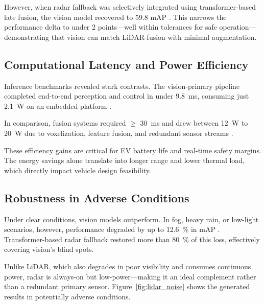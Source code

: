 \documentclass[12pt]{article}
\begin{document}
However, when radar fallback was selectively integrated using transformer-based late fusion, the vision model recovered to 59.8 mAP \autocite{Liao2024RadarVisionFusion}. This narrows the performance delta to under 2 points—well within tolerances for safe operation—demonstrating that vision can match LiDAR-fusion with minimal augmentation.

\subsection{Computational Latency and Power Efficiency}

Inference benchmarks revealed stark contrasts. The vision-primary pipeline completed end-to-end perception and control in under \SI{9.8}{\milli\second}, consuming just \SI{2.1}{\watt} on an embedded platform \autocite{Chen2024EndToEndAD}.

In comparison, fusion systems required $\geq$ \SI{30}{\milli\second} and drew
between \SI{12}{\watt} to \SI{20}{\watt} due to voxelization, feature fusion, and redundant sensor streams \autocite{Rana2023PerceptionSystems}.

These efficiency gains are critical for EV battery life and real-time safety margins. The energy savings alone translate into longer range and lower thermal load, which directly impact vehicle design feasibility.

\subsection{Robustness in Adverse Conditions}

Under clear conditions, vision models outperform. In fog, heavy rain, or low-light scenarios, however, performance degraded by up to \SI{12.6}{\percent} in mAP \autocite{Han2023FourDRadarSurvey}. Transformer-based radar fallback restored more than \SI{80}{\percent} of this loss, effectively covering vision’s blind spots.

Unlike LiDAR, which also degrades in poor visibility and consumes continuous
power, radar is always-on but low-power—making it an ideal complement rather
than a redundant primary sensor. Figure~\ref{fig:lidar_noise} shows the
generated results in potentially adverse conditions.
\end{document}
